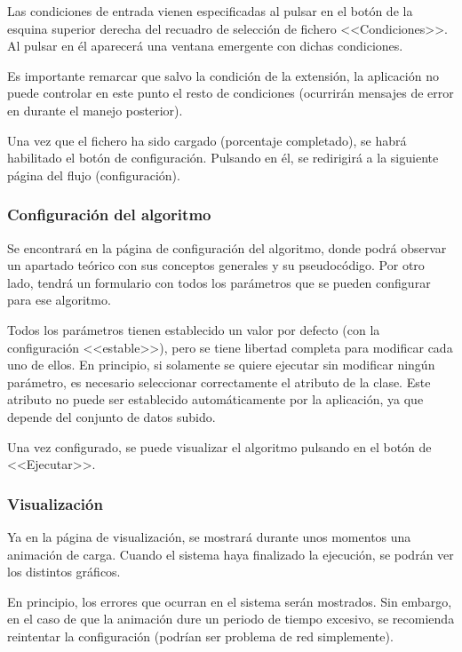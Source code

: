 Las condiciones de entrada vienen especificadas al pulsar en el botón de la
esquina superior derecha del recuadro de selección de fichero <<Condiciones>>.
Al pulsar en él aparecerá una ventana emergente con dichas condiciones.


Es importante remarcar que salvo la condición de la extensión, la aplicación no
puede controlar en este punto el resto de condiciones (ocurrirán mensajes de
error en durante el manejo posterior).

Una vez que el fichero ha sido cargado (porcentaje completado), se habrá
habilitado el botón de configuración. Pulsando en él, se redirigirá a la
siguiente página del flujo (configuración).

\subsubsection{Configuración del algoritmo}
\label{mu:configuracion}
Se encontrará en la página de configuración del algoritmo, donde podrá observar
un apartado teórico con sus conceptos generales y su pseudocódigo. Por otro
lado, tendrá un formulario con todos los parámetros que se pueden configurar
para ese algoritmo.


Todos los parámetros tienen establecido un valor por defecto (con la
configuración <<estable>>), pero se tiene libertad completa para modificar cada
uno de ellos. En principio, si solamente se quiere ejecutar sin modificar ningún
parámetro, es necesario seleccionar correctamente el atributo de la clase.
Este atributo no puede ser establecido automáticamente por la aplicación, ya que
depende del conjunto de datos subido. 

Una vez configurado, se puede visualizar el algoritmo pulsando en el botón de
<<Ejecutar>>.

\subsubsection{Visualización}
\label{mu:visualizacion}
Ya en la página de visualización, se mostrará durante unos momentos una
animación de carga. Cuando el sistema haya finalizado la ejecución, se podrán
ver los distintos gráficos.

En principio, los errores que ocurran en el sistema serán mostrados. Sin
embargo, en el caso de que la animación dure un periodo de tiempo excesivo, se
recomienda reintentar la configuración (podrían ser problema de red
simplemente).

